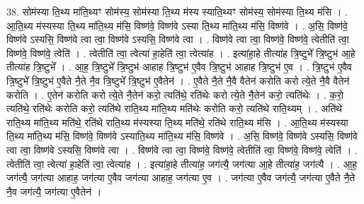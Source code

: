 \documentclass[17pt]{extarticle}
\begin{document}
38. सोम॑स्या ति॒थ्य मा॑ति॒थ्यꣳ सोम॑स्य॒ सोम॑स्या ति॒थ्य म॑स्य स्याति॒थ्यꣳ सोम॑स्य॒ सोम॑स्या ति॒थ्य म॑सि । . आ॒ति॒थ्य म॑स्यस्या ति॒थ्य मा॑ति॒थ्य म॑सि॒ विष्ण॑वे॒ विष्ण॑वे ऽस्या ति॒थ्य मा॑ति॒थ्य म॑सि॒ विष्ण॑वे । . अ॒सि॒ विष्ण॑वे॒ विष्ण॑वे ऽस्यसि॒ विष्ण॑वे त्वा त्वा॒ विष्ण॑वे ऽस्यसि॒ विष्ण॑वे त्वा । . विष्ण॑वे त्वा त्वा॒ विष्ण॑वे॒ विष्ण॑वे॒ त्वेतीति॑ त्वा॒ विष्ण॑वे॒ विष्ण॑वे॒ त्वेति॑ । . त्वेतीति॑ त्वा॒ त्वेत्या॑ हा॒हेति॑ त्वा॒ त्वेत्या॑ह । . इत्या॑हा॒हे तीत्या॑ह त्रि॒ष्टुभे᳚ त्रि॒ष्टुभ॑ आ॒हे तीत्या॑ह त्रि॒ष्टुभे᳚ । . आ॒ह॒ त्रि॒ष्टुभे᳚ त्रि॒ष्टुभ॑ आहाह त्रि॒ष्टुभ॑ ए॒वैव त्रि॒ष्टुभ॑ आहाह त्रि॒ष्टुभ॑ ए॒व । . त्रि॒ष्टुभ॑ ए॒वैव त्रि॒ष्टुभे᳚ त्रि॒ष्टुभ॑ ए॒वैते नै॒ते नै॒व त्रि॒ष्टुभे᳚ त्रि॒ष्टुभ॑ ए॒वैतेन॑ । . ए॒वैते नै॒ते नै॒वै वैतेन॑ करोति करो त्ये॒ते नै॒वै वैतेन॑ करोति । . ए॒तेन॑ करोति करो त्ये॒ते नै॒तेन॑ करो॒ त्यति॑थे॒ रति॑थेः करो त्ये॒ते नै॒तेन॑ करो॒ त्यति॑थेः । . क॒रो॒ त्यति॑थे॒ रति॑थेः करोति करो॒ त्यति॑थे राति॒थ्य मा॑ति॒थ्य मति॑थेः करोति करो॒ त्यति॑थे राति॒थ्यम् । . अति॑थे राति॒थ्य मा॑ति॒थ्य मति॑थे॒ रति॑थे राति॒थ्य म॑स्यस्या ति॒थ्य मति॑थे॒ रति॑थे राति॒थ्य म॑सि । . आ॒ति॒थ्य म॑स्यस्या ति॒थ्य मा॑ति॒थ्य म॑सि॒ विष्ण॑वे॒ विष्ण॑वे ऽस्याति॒थ्य मा॑ति॒थ्य म॑सि॒ विष्ण॑वे । . अ॒सि॒ विष्ण॑वे॒ विष्ण॑वे ऽस्यसि॒ विष्ण॑वे त्वा त्वा॒ विष्ण॑वे ऽस्यसि॒ विष्ण॑वे त्वा । . विष्ण॑वे त्वा त्वा॒ विष्ण॑वे॒ विष्ण॑वे॒ त्वेतीति॑ त्वा॒ विष्ण॑वे॒ विष्ण॑वे॒ त्वेति॑ । . त्वेतीति॑ त्वा॒ त्वेत्या॑ हा॒हेति॑ त्वा॒ त्वेत्या॑ह । . इत्या॑हा॒हे तीत्या॑ह॒ जग॑त्यै॒ जग॑त्या आ॒हे तीत्या॑ह॒ जग॑त्यै । . आ॒ह॒ जग॑त्यै॒ जग॑त्या आहाह॒ जग॑त्या ए॒वैव जग॑त्या आहाह॒ जग॑त्या ए॒व । . जग॑त्या ए॒वैव जग॑त्यै॒ जग॑त्या ए॒वैते नै॒ते नै॒व जग॑त्यै॒ जग॑त्या ए॒वैतेन॑ । \newline
\pagebreak
{}
\end{document}
